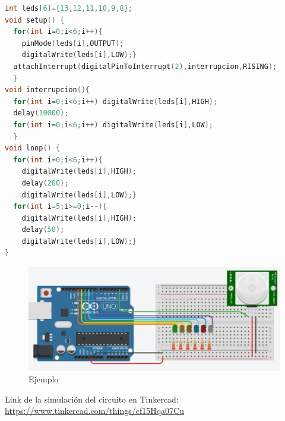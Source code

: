 \documentclass[12pt]{article}
\begin{document}
\vspace{10}

\begin{lstlisting}[language=C++]
int leds[6]={13,12,11,10,9,8};
void setup() {
  for(int i=0;i<6;i++){
    pinMode(leds[i],OUTPUT);
    digitalWrite(leds[i],LOW);}
  attachInterrupt(digitalPinToInterrupt(2),interrupcion,RISING);
  }
void interrupcion(){
  for(int i=0;i<6;i++) digitalWrite(leds[i],HIGH);
  delay(10000);
  for(int i=0;i<6;i++) digitalWrite(leds[i],LOW);
  }
void loop() {
  for(int i=0;i<6;i++){
    digitalWrite(leds[i],HIGH);
    delay(200);
    digitalWrite(leds[i],LOW);}
  for(int i=5;i>=0;i--){
    digitalWrite(leds[i],HIGH);
    delay(50);
    digitalWrite(leds[i],LOW);}
}
\end{lstlisting}

\begin{figure}[h]
    \centering
    \includegraphics[width=16cm]{ejemplo.jpg}
    \caption{Ejemplo}
    \label{fig:my_label}
\end{figure}

\vspace{10}
Link de la simulación del circuito en Tinkercad: \url{https://www.tinkercad.com/things/cf15Hqa07Cu}


\newpage

 


\end{document}
